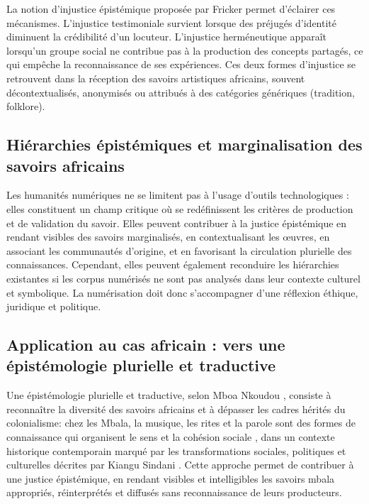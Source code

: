 \documentclass[final,fra]{anthology-ch}         %
\begin{document}
La notion d’injustice épistémique proposée par Fricker \cite{fricker2007epistemic} permet d’éclairer ces mécanismes. L’injustice testimoniale survient lorsque des préjugés d’identité diminuent la crédibilité d’un locuteur. L’injustice herméneutique apparaît lorsqu’un groupe social ne contribue pas à la production des concepts partagés, ce qui empêche la reconnaissance de ses expériences. Ces deux formes d’injustice se retrouvent dans la réception des savoirs artistiques africains, souvent décontextualisés, anonymisés ou attribués à des catégories génériques (\og tradition\fg{}, \og folklore\fg{}).

\subsection{Hiérarchies épistémiques et marginalisation des savoirs africains}

Les humanités numériques ne se limitent pas à l'usage d'outils technologiques : elles constituent un champ critique où se redéfinissent les critères de production et de validation du savoir. Elles peuvent contribuer à la justice épistémique en rendant visibles des savoirs marginalisés, en contextualisant les œuvres, en associant les communautés d’origine, et en favorisant la circulation plurielle des connaissances. Cependant, elles peuvent également reconduire les hiérarchies existantes si les corpus numérisés ne sont pas analysés dans leur contexte culturel et symbolique. La numérisation doit donc s’accompagner d’une réflexion éthique, juridique et politique.

\subsection{Application au cas africain : vers une épistémologie plurielle et traductive}

Une épistémologie plurielle et traductive, selon Mboa Nkoudou \cite{nkoudou2015strategies}, consiste à reconnaître la diversité des savoirs africains et à dépasser les cadres hérités du colonialisme: chez les Mbala, la musique, les rites et la parole sont des formes de connaissance qui organisent le sens et la cohésion sociale \cite{matangila1994rites}, dans un contexte historique contemporain marqué par les transformations sociales, politiques et culturelles décrites par Kiangu Sindani \cite{kiangu_sindani_kwilu_2009}. Cette approche permet de contribuer à une justice épistémique, en rendant visibles et intelligibles les savoirs mbala appropriés, réinterprétés et diffusés sans reconnaissance de leurs producteurs.
\end{document}
